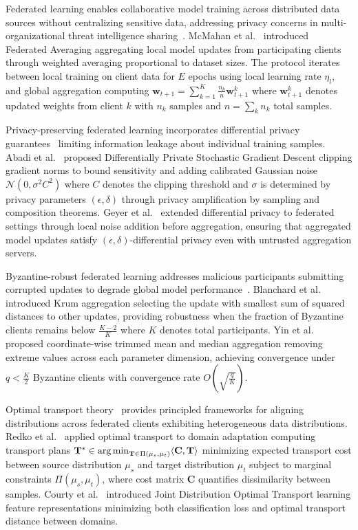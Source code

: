 Federated learning enables collaborative model training across distributed data sources without centralizing sensitive data, addressing privacy concerns in multi-organizational threat intelligence sharing~\cite{kairouz2021advances,li2020federated}. McMahan et al.~\cite{mcmahan2017communication} introduced Federated Averaging aggregating local model updates from participating clients through weighted averaging proportional to dataset sizes. The protocol iterates between local training on client data for $E$ epochs using local learning rate $\eta_l$, and global aggregation computing $\mathbf{w}_{t+1} = \sum_{k=1}^K \frac{n_k}{n}\mathbf{w}_{t+1}^k$ where $\mathbf{w}_{t+1}^k$ denotes updated weights from client $k$ with $n_k$ samples and $n = \sum_k n_k$ total samples.

Privacy-preserving federated learning incorporates differential privacy guarantees~\cite{dwork2006calibrating,dwork2014algorithmic} limiting information leakage about individual training samples. Abadi et al.~\cite{abadi2016deep} proposed Differentially Private Stochastic Gradient Descent clipping gradient norms to bound sensitivity and adding calibrated Gaussian noise $\mathcal{N}(0, \sigma^2 C^2)$ where $C$ denotes the clipping threshold and $\sigma$ is determined by privacy parameters $(\epsilon, \delta)$ through privacy amplification by sampling and composition theorems. Geyer et al.~\cite{geyer2017differentially} extended differential privacy to federated settings through local noise addition before aggregation, ensuring that aggregated model updates satisfy $(\epsilon, \delta)$-differential privacy even with untrusted aggregation servers.

Byzantine-robust federated learning addresses malicious participants submitting corrupted updates to degrade global model performance~\cite{lamport1982byzantine}. Blanchard et al.~\cite{blanchard2017machine} introduced Krum aggregation selecting the update with smallest sum of squared distances to other updates, providing robustness when the fraction of Byzantine clients remains below $\frac{K-2}{K}$ where $K$ denotes total participants. Yin et al.~\cite{yin2018byzantine} proposed coordinate-wise trimmed mean and median aggregation removing extreme values across each parameter dimension, achieving convergence under $q < \frac{K}{2}$ Byzantine clients with convergence rate $O\left(\sqrt{\frac{q}{K}}\right)$.

Optimal transport theory~\cite{villani2009optimal,peyre2019computational} provides principled frameworks for aligning distributions across federated clients exhibiting heterogeneous data distributions. Redko et al.~\cite{redko2017theoretical} applied optimal transport to domain adaptation computing transport plans $\mathbf{T}^* \in \operatorname*{arg\,min}_{\mathbf{T} \in \Pi(\mu_s, \mu_t)} \langle \mathbf{C}, \mathbf{T} \rangle$ minimizing expected transport cost between source distribution $\mu_s$ and target distribution $\mu_t$ subject to marginal constraints $\Pi(\mu_s, \mu_t)$, where cost matrix $\mathbf{C}$ quantifies dissimilarity between samples. Courty et al.~\cite{courty2017optimal} introduced Joint Distribution Optimal Transport learning feature representations minimizing both classification loss and optimal transport distance between domains.

